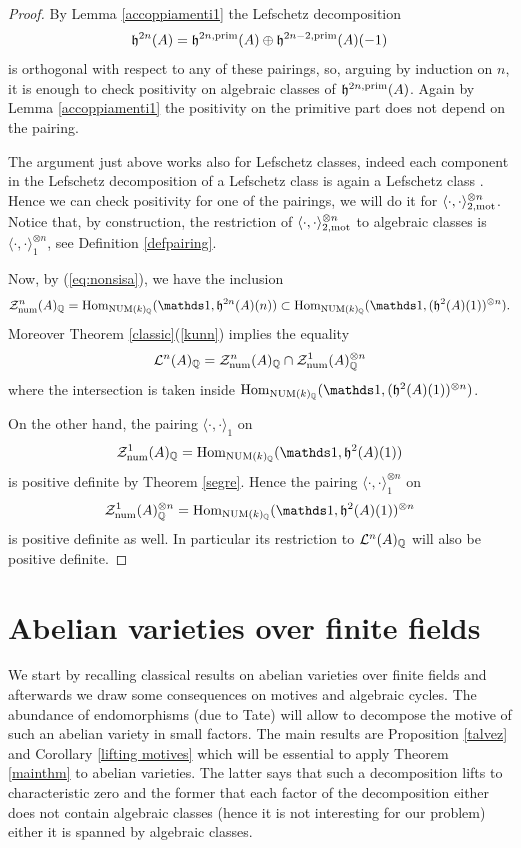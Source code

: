 \documentclass[11pt]{amsart}
\begin{document}
\begin{proof}
By Lemma \ref{accoppiamenti1} the Lefschetz decomposition \[\mathfrak{h}^{2n}(A) = \mathfrak{h}^{2n,\mathrm{prim}}(A) \oplus \mathfrak{h}^{2n-2,\mathrm{prim}}(A) (-1)\] is orthogonal with respect to any of these pairings, so, arguing by induction on $n$, it is enough to check positivity on algebraic classes of $ \mathfrak{h}^{2n,\mathrm{prim}}(A)$. Again by Lemma \ref{accoppiamenti1} the positivity on the primitive part does not depend on the pairing.



The argument just above works also for Lefschetz classes, indeed each component in the Lefschetz decomposition of a Lefschetz class is again a Lefschetz class  \cite[p. 640]{Milnelef}. Hence we can check positivity for one of the pairings, we will do it for $\langle \cdot, \cdot \rangle_{2,\mathrm{mot}}^{\otimes n}$. Notice that, by construction, the restriction of $\langle \cdot, \cdot \rangle_{2,\mathrm{mot}}^{\otimes n}$ to algebraic classes is $\langle \cdot, \cdot \rangle_{1}^{\otimes n}$, see Definition \ref{defpairing}.


Now, by (\ref{eq:nonsisa}), we have the inclusion
 \[\mathcal{Z}^n_{\num}(A)_{\Q}=\Hom_{\NUM(k)_\Q}(\one, \mathfrak{h}^{2n}(A)(n)) \subset  \Hom_{\NUM(k)_\Q}(\one,(\mathfrak{h}^2(A)(1))^{\otimes n}).\] 
 Moreover Theorem \ref{classic}(\ref{kunn})   implies the equality
 \[\mathcal{L}^{n}(A)_{\mathbb{Q}} = \mathcal{Z}^n_{\mathrm{num}}(A)_{\mathbb{Q}} \cap \mathcal{Z}^1_{\mathrm{num}}(A)_{\mathbb{Q}}^{\otimes n}\]
 where the intersection is taken inside  $\Hom_{\NUM(k)_\Q}(\one,(\mathfrak{h}^2(A)(1))^{\otimes n})$.

On the other hand, the pairing $\langle \cdot, \cdot \rangle_1$ on \[\mathcal{Z}^1_{\num}(A)_{\Q}= \Hom_{\NUM(k)_\Q}(\one, \mathfrak{h}^2(A)(1))\] 
is positive definite by Theorem \ref{segre}. Hence the pairing $\langle \cdot, \cdot \rangle_1^{\otimes n}$ on \[\mathcal{Z}^1_{\num}(A)^{\otimes n}_{\Q} = \Hom_{\NUM(k)_\Q}(\one, \mathfrak{h}^2(A)(1))^{\otimes n}\] is positive definite as well. In particular its restriction to $\mathcal{L}^{n}(A)_{\mathbb{Q}}$ will also be positive definite. \end{proof}




\section{Abelian varieties over finite fields}\label{finitefields}




We start by recalling classical results on abelian varieties over finite fields and afterwards we draw some consequences on motives and algebraic cycles. The abundance of endomorphisms (due to Tate) will allow to decompose the motive of such an abelian variety in small factors. The main results  are Proposition \ref{talvez} and Corollary \ref{lifting motives} which will be essential to apply Theorem \ref{mainthm} to abelian varieties. The latter  says that such a decomposition lifts to characteristic zero and the former that each factor of the decomposition either does not contain algebraic classes (hence it is not interesting for our problem) either it is spanned by algebraic classes.
\end{document}

